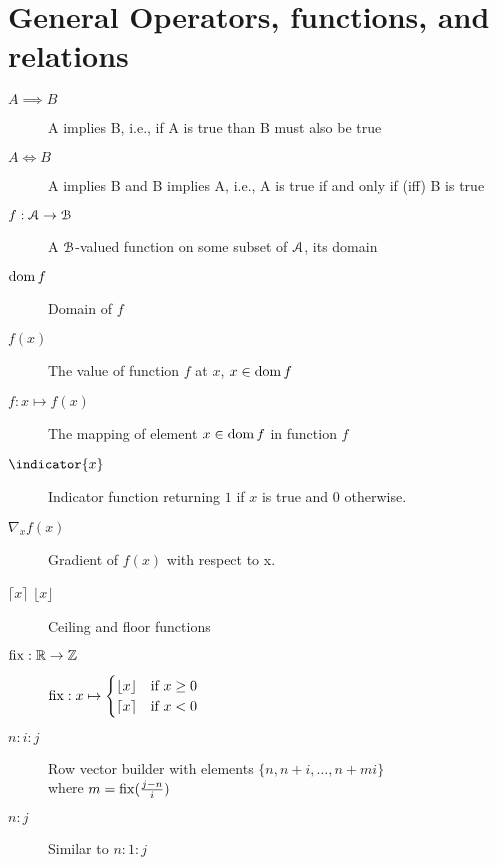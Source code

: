 \documentclass[../main.tex]{subfiles}
\begin{document}
\section*{General Operators, functions, and relations}
\begin{description}
  \item[$A\implies B$] A implies B, i.e., if A is true than B must also be true
  \item[$A\iff B$] A implies B and B implies A, i.e., A is true if and only if (iff) B is true
  \item[$f:\mathcal{A}\to\mathcal{B}$] A $\mathcal{B}$-valued function on some subset of $\mathcal{A}$, its domain
  \item[$\operatorname{dom} f$] Domain of $f$
  \item[$f(x)$] The value of function $f$ at $x$, $x\in\operatorname{dom} f$
  \item[$f:x\mapsto f(x)$] The mapping of element $x\in\operatorname{dom} f$ in function $f$
  \item[$\indicator{x}$] Indicator function returning $1$ if $x$ is true and $0$ otherwise.
  \item[$\nabla_{x}f(x)$] Gradient of $f(x)$ with respect to x.
  \item[$\lceil x\rceil$ $\lfloor x\rfloor$] Ceiling and floor functions
  \item[$\operatorname{fix}:\mathbb{R}\to\mathbb{Z}$] $\operatorname{fix}:x\mapsto
        \begin{cases}
          \lfloor x\rfloor&\text{if $x\geq0$}\\
          \lceil x\rceil&\text{if $x<0$}\\
        \end{cases}
        $
  \item[$n:i:j$] Row vector builder with elements ${\{n,n+i,\dots,n+mi\}}$
        \\where $m=\operatorname{fix}(\frac{j-n}{i})$
  \item[$n\mathbin{:}j$] Similar to ${n\mathbin{:}1\mathbin{:}j}$
\end{description}
\end{document}
